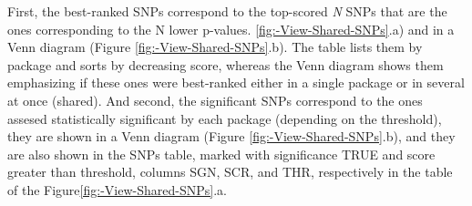 \documentclass{article}
\begin{document}
First, the best-ranked SNPs correspond to the top-scored \emph{N} SNPs that are the ones corresponding to the N lower p-values. \ref{fig:-View-Shared-SNPs}.a) and in a Venn diagram (Figure \ref{fig:-View-Shared-SNPs}.b). The table lists them by package and sorts by decreasing score, whereas the Venn diagram shows them emphasizing if these ones were best-ranked either in a single package or in several at once (shared). And second, the significant SNPs correspond to the ones assesed statistically significant by each package (depending on the threshold), they are shown in a Venn diagram (Figure \ref{fig:-View-Shared-SNPs}.b), and they are also shown in the SNPs table, marked with significance TRUE and score greater than threshold, columns SGN, SCR, and THR, respectively in the table of the Figure\ref{fig:-View-Shared-SNPs}.a.


\end{document}
